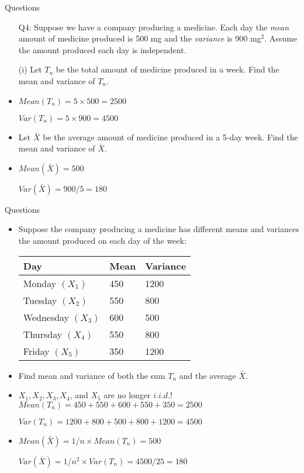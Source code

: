 \documentclass[10pt, xcolor=table]{beamer}
\begin{document}
\begin{frame}{Questions}
\begin{itemize}
\setlength{\itemsep}{15pt}
\item[Q4:] Suppose we have a company producing a medicine. Each day the \emph{mean} amount of medicine produced is 500 mg and the \emph{variance} is 900 mg$^2$. Assume the amount produced each day is independent.
\item[(i)] Let $T_n$ be the total amount of medicine produced in a week. Find the mean and variance of $T_n$. 
\item<2->[] {\color{red} $Mean(T_n) =   5\times 500 = 2500$}

 {\color{red} $Var(T_n) = 5\times 900 = 4500$}
\item<3->[(ii)] Let $\bar{X}$ be the average amount of medicine produced in a 5-day week. Find the mean and variance of $\bar{X}$.
\item<4->[] {\color{red} $Mean(\bar{X}) = 500$} 

{\color{red} $Var(\bar{X}) = 900/5 = 180$}
\end{itemize}
\end{frame}


\begin{frame}{Questions}
\begin{itemize}
\setlength{\itemsep}{10pt}
\item<1->[Q6:] Suppose the company producing a medicine has different means and variances the amount produced on each day of the week:
\begin{table}
\begin{tabular}{l|ll}
Day & Mean & Variance \\ \hline
Monday $(X_1)$ & 450 & 1200 \\
Tuesday $(X_2)$ & 550 & 800 \\
Wednesday $(X_3)$ & 600 & 500  \\
Thursday $(X_4)$ & 550 & 800 \\
Friday $(X_5)$ & 350 & 1200 
\end{tabular}
\end{table}
\item<2->[] Find mean and variance of both the sum $T_n$ and the average $\bar{X}$.
\item<3->[A6:] {\color{red} $X_1, X_2, X_3, X_4$, and $X_5$ are no longer $i.i.d.$!\\
\bigskip
$Mean(T_n) = 450 + 550 + 600 + 550 + 350 = 2500$

$Var(T_n) = 1200 + 800 + 500 + 800 + 1200 = 4500$}
\item<4->[] {\color{red} $Mean(\bar{X}) = 1/n \times Mean(T_n) = 500$ 

$Var(\bar{X}) = 1/n^2 \times Var(T_n) = 4500/25 = 180$}
\end{itemize}
\end{frame}
\end{document}
